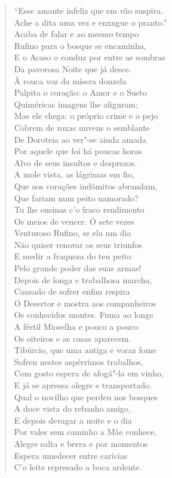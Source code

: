 \begin{verse}
``Esse amante infeliz que em vão suspira,\\
Ache a dita uma vez e enxugue o pranto.''\\
Acaba de falar e ao mesmo tempo\\
Rufino para o bosque se encaminha,\\
E o Acaso o conduz por entre as sombras\\		\index{\Acaso}
Da pavorosa Noite que já desce.\\
À rouca voz da mísera donzela\\
Palpita o coração: o Amor e o Susto\\			\index{\Amor}
Quiméricas imagens lhe afiguram;\\
Mas ele chega: o próprio crime e o pejo\\
Cobrem de roxas nuvens o semblante\\
De Doroteia ao ver"-se ainda amada\\
Por aquele que foi há poucas horas\\
Alvo de seus insultos e desprezos.\\
A mole vista, as lágrimas em fio,\\
Que aos corações indômitos abrandam,\\
Que fariam num peito namorado?\\
Tu lhe ensinas c'o fraco rendimento\\
Os meios de vencer. Ó sete vezes\\
Venturoso Rufino, se ela um dia\\
Não quiser renovar os seus triunfos\\
E medir a fraqueza do teu peito\\
Pelo grande poder das suas armas! \\[10pt]


Depois de longa e trabalhosa marcha,\\
Cansado de sofrer enfim respira\\
O Desertor e mostra aos companheiros\\
Os conhecidos montes. Fuma ao longe\\
A fértil Mioselha e pouco a pouco\\
Os oiteiros e as casas aparecem. \\[10pt]


Tibúrcio, que uma antiga e voraz fome\\
Sofreu nestes aspérrimos trabalhos,\\
Com gosto espera de afogá"-la em vinho,\\
E já se apressa alegre e transportado.\\
Qual o novilho que perdeu nos bosques\\
A doce vista do rebanho amigo,\\
E depois devagar a noite e o dia\\
Por vales sem caminho a Mãe conhece,\\
Alegre salta e berra e por momentos\\
Espera umedecer entre carícias\\
C'o leite represado a boca ardente. \\[10pt]



\end{verse}
